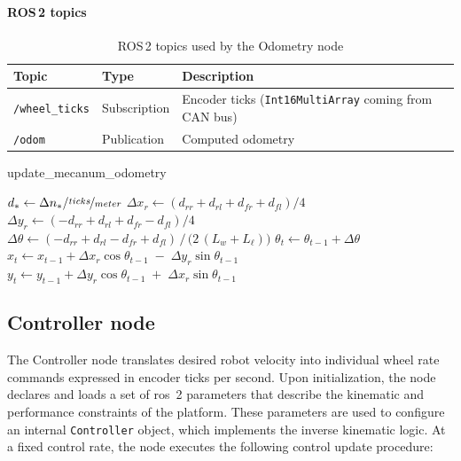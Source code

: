 \paragraph*{ROS\,2 topics}
\begin{table}[H]
  \centering
  \begin{tabular}{lll}
    \toprule
    \textbf{Topic}         & \textbf{Type}                                                & \textbf{Description} \\
    \midrule
    \texttt{/wheel\_ticks} & Subscription
                           & Encoder ticks (\texttt{Int16MultiArray} coming from CAN bus)                        \\
    \texttt{/odom}         & Publication
                           & Computed odometry                                                                   \\
    \bottomrule
  \end{tabular}
  \caption{ROS\,2 topics used by the Odometry node}
  \label{tab:odo-topics}
\end{table}

\begin{algorithm}[H]
  \caption{update\_mecanum\_odometry}
  \begin{algorithmic}[1]
    \State $d_{*} \gets \Delta n_{*} / \nicefrac{ticks}{meter}$
    \State $\Delta x_r \gets (d_{rr} + d_{rl} + d_{fr} + d_{fl}) / 4$
    \State $\Delta y_r \gets (-d_{rr} + d_{rl} + d_{fr} - d_{fl}) / 4$
    \State $\Delta \theta \gets (-d_{rr} + d_{rl} - d_{fr} + d_{fl}) \,/\, \bigl(2\,(L_w + L_\ell)\bigr)$
    \State $\theta_{t} \gets \theta_{t-1} + \Delta \theta$
    \State $x_{t} \gets x_{t-1} + \Delta x_r \cos\theta_{t-1} \;-\; \Delta y_r \sin\theta_{t-1}$
    \State $y_{t} \gets y_{t-1} + \Delta y_r \cos\theta_{t-1} \;+\; \Delta x_r \sin\theta_{t-1}$
    \EndFunction
  \end{algorithmic}
\end{algorithm}

\subsection{Controller node}

The Controller node translates desired robot velocity into individual wheel rate commands expressed in encoder ticks per second. Upon initialization, the node declares and loads a set of \gls{ros}~2 parameters that describe the kinematic and performance constraints of the platform. These parameters are used to configure an internal \texttt{Controller} object, which implements the inverse kinematic logic. At a fixed control rate, the node executes the following control update procedure:

